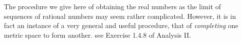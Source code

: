 \begin{note}
  The procedure we give here of obtaining the real numbers as the limit of sequences of rational numbers may seem rather complicated.
  However, it is in fact an instance of a very general and useful procedure, that of \emph{completing} one metric space to form another.
  see Exercise 1.4.8 of Analysis II.
\end{note}







